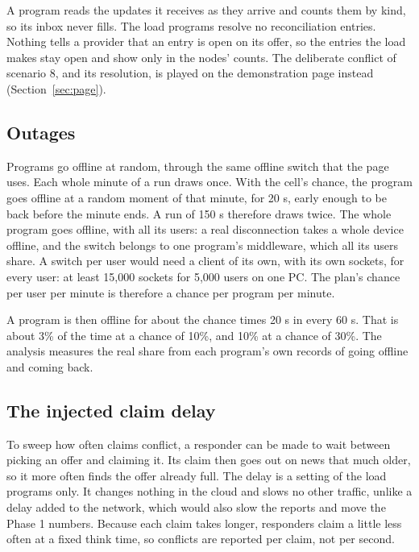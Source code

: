 A program reads the updates it receives as they arrive and counts them by kind, so its inbox never fills. The load programs resolve no reconciliation entries. Nothing tells a provider that an entry is open on its offer, so the entries the load makes stay open and show only in the nodes' counts. The deliberate conflict of scenario 8, and its resolution, is played on the demonstration page instead (Section~\ref{sec:page}).

\subsection{Outages}

Programs go offline at random, through the same offline switch that the page uses. Each whole minute of a run draws once. With the cell's chance, the program goes offline at a random moment of that minute, for 20 s, early enough to be back before the minute ends. A run of 150 s therefore draws twice. The whole program goes offline, with all its users: a real disconnection takes a whole device offline, and the switch belongs to one program's middleware, which all its users share. A switch per user would need a client of its own, with its own sockets, for every user: at least 15,000 sockets for 5,000 users on one PC. The plan's chance per user per minute is therefore a chance per program per minute.

A program is then offline for about the chance times 20 s in every 60 s. That is about 3\% of the time at a chance of 10\%, and 10\% at a chance of 30\%. The analysis measures the real share from each program's own records of going offline and coming back.

\subsection{The injected claim delay}

To sweep how often claims conflict, a responder can be made to wait between picking an offer and claiming it. Its claim then goes out on news that much older, so it more often finds the offer already full. The delay is a setting of the load programs only. It changes nothing in the cloud and slows no other traffic, unlike a delay added to the network, which would also slow the reports and move the Phase 1 numbers. Because each claim takes longer, responders claim a little less often at a fixed think time, so conflicts are reported per claim, not per second.

